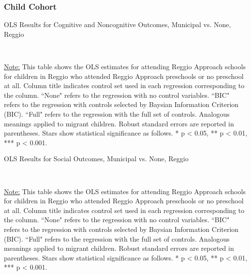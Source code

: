 \subsubsection{Child Cohort}

\begin{table}[H] \caption{OLS Results for Cognitive and Noncognitive Outcomes, Municipal vs. None, Reggio} \label{ols-CN-child-reg}

\vspace{1ex} \\
\footnotesize\raggedright{\underline{Note:} This table shows the OLS estimates for attending Reggio Approach schools for children in Reggio who attended Reggio Approach preschools or no preschool at all. Column title indicates control set used in each regression corresponding to the column. ``None" refers to the regression with no control variables. ``BIC" refers to the regression with controls selected by Baysian Information Criterion (BIC). ``Full" refers to the regression with the full set of controls. Analogous meanings applied to migrant children. Robust standard errors are reported in parentheses. Stars show statistical significance as follows. * p < 0.05, ** p < 0.01, *** p < 0.001.}
\end{table}

\begin{table}[H] \caption{OLS Results for Social Outcomes, Municipal vs. None, Reggio} \label{ols-S-child-reg}

\vspace{1ex} \\
\footnotesize\raggedright{\underline{Note:} This table shows the OLS estimates for attending Reggio Approach schools for children in Reggio who attended Reggio Approach preschools or no preschool at all. Column title indicates control set used in each regression corresponding to the column. ``None" refers to the regression with no control variables. ``BIC" refers to the regression with controls selected by Baysian Information Criterion (BIC). ``Full" refers to the regression with the full set of controls. Analogous meanings applied to migrant children. Robust standard errors are reported in parentheses. Stars show statistical significance as follows. * p < 0.05, ** p < 0.01, *** p < 0.001.}
\end{table}

